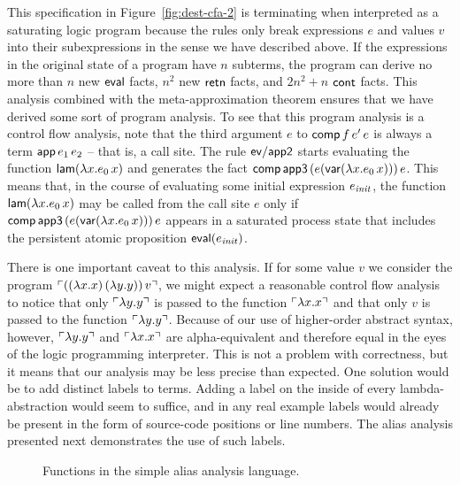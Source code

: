 This specification in Figure~\ref{fig:dest-cfa-2} is terminating when
interpreted as a saturating logic program because the rules only break
expressions $e$ and values $v$ into their subexpressions in the sense
we have described above. If the expressions in the original state of a
program have $n$ subterms, the program can derive no more than $n$ new
${\sf eval}$ facts, $n^2$ new ${\sf retn}$ facts, and $2n^2 + n$ ${\sf
  cont}$ facts. This analysis combined with the meta-approximation
theorem ensures that we have derived some sort of program analysis. To
see that this program analysis is a control flow analysis, note that
the third argument $e$ to ${\sf comp}\,f\,e'\,e$ is always a term
${\sf app}\,e_1\,e_2$ -- that is, a call site. The rule ${\sf
  ev/app2}$ starts evaluating the function ${\sf lam}(\lambda
x.e_0\,x)$ and generates the fact ${\sf comp}\,{\sf app3}\,(e({\sf
  var}(\lambda x.e_0\,x)))\,e$. This means that, in the course of
evaluating some initial expression $e_{\it init}$, the function ${\sf
  lam}(\lambda x.e_0\,x)$ may be called from the call site $e$ only if
${\sf comp}\,{\sf app3}\,(e({\sf var}(\lambda x.e_0\,x)))\,e$ appears
in a saturated process state that includes the persistent 
atomic proposition ${\sf eval}(e_{\it init})$.

There is one important caveat to this analysis. If for some value $v$
we consider the program ${\ulcorner{((\lambda x.x)\,(\lambda y.y))\,v}\urcorner}$,
we might expect a reasonable control flow analysis to notice that only
${\ulcorner{\lambda y.y}\urcorner}$ is passed to the function ${\ulcorner{\lambda
  x.x}\urcorner}$ and that only $v$ is passed to the function ${\ulcorner{\lambda
  y.y}\urcorner}$. Because of our use of higher-order abstract syntax, however,
${\ulcorner{\lambda y.y}\urcorner}$ and ${\ulcorner{\lambda x.x}\urcorner}$ are alpha-equivalent
and therefore equal in the eyes of the logic programming
interpreter. This is not a problem with correctness, but it means that
our analysis may be less precise than expected. One solution would be
to add distinct labels to terms. Adding a label on the inside of every
lambda-abstraction would seem to suffice, and in any real example
labels would already be present in the form of source-code positions
or line numbers. The alias analysis presented next demonstrates the
use of such labels.

\begin{figure}
\caption{Functions in the simple alias analysis language.}
\label{fig:ssos-monadic}
\end{figure}

